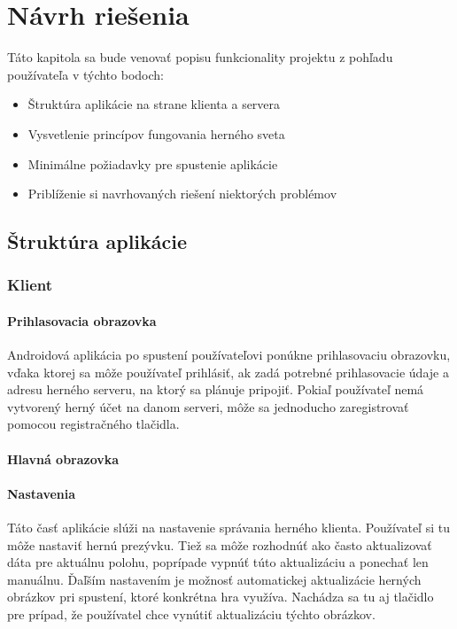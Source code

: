 \chapter{Návrh riešenia}
Táto kapitola sa bude venovať popisu funkcionality projektu z pohľadu používateľa v týchto bodoch:

\begin{itemize}
  \item Štruktúra aplikácie na strane klienta a servera
  \item Vysvetlenie princípov fungovania herného sveta
  \item Minimálne požiadavky pre spustenie aplikácie
  \item Priblíženie si navrhovaných riešení niektorých problémov
\end{itemize}




\section{Štruktúra aplikácie}
\subsection{Klient}
\subsubsection{Prihlasovacia obrazovka}
Androidová aplikácia po spustení používateľovi ponúkne prihlasovaciu obrazovku, vďaka ktorej sa môže používateľ prihlásiť, ak zadá potrebné prihlasovacie údaje a adresu herného serveru, na ktorý sa plánuje pripojiť. Pokiaľ používateľ nemá vytvorený herný účet na danom serveri, môže sa jednoducho zaregistrovať pomocou registračného tlačidla.

\subsubsection{Hlavná obrazovka}


\subsubsection{Nastavenia}
Táto časť aplikácie slúži na nastavenie správania herného klienta. Používateľ si tu môže nastaviť hernú prezývku. Tiež sa môže rozhodnúť ako často aktualizovať dáta pre aktuálnu polohu, poprípade vypnúť túto aktualizáciu a ponechať len manuálnu. Ďaľším nastavením je možnosť automatickej aktualizácie herných obrázkov pri spustení, ktoré konkrétna hra využíva. Nachádza sa tu aj tlačidlo pre prípad, že používatel chce vynútiť aktualizáciu týchto obrázkov.

